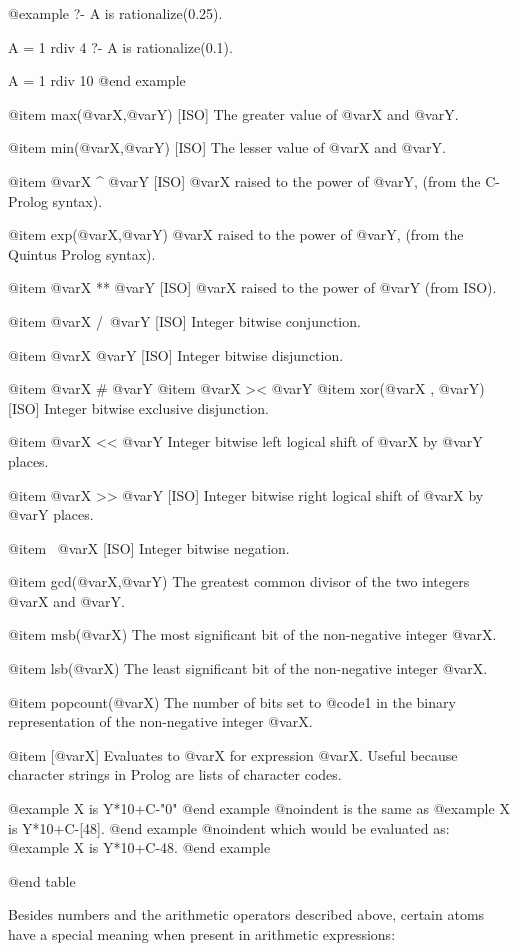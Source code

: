 {{{{@example
?- A is rationalize(0.25).

A = 1 rdiv 4
?- A is rationalize(0.1).

A = 1 rdiv 10
@end example


@item max(@var{X},@var{Y}) [ISO]
The greater value of @var{X} and @var{Y}.

@item min(@var{X},@var{Y}) [ISO]
The lesser value of @var{X} and @var{Y}.

@item @var{X} ^ @var{Y} [ISO]
@var{X} raised to the power of @var{Y}, (from the C-Prolog syntax).

@item exp(@var{X},@var{Y})
@var{X} raised to the power of @var{Y}, (from the Quintus Prolog syntax).

@item @var{X} ** @var{Y} [ISO]
@var{X} raised to the power of @var{Y}  (from ISO).

@item @var{X} /\ @var{Y} [ISO]
Integer bitwise conjunction.

@item @var{X} \/ @var{Y} [ISO]
Integer bitwise disjunction.

@item @var{X} # @var{Y}
@item @var{X} >< @var{Y}
@item xor(@var{X} , @var{Y}) [ISO]
Integer bitwise exclusive disjunction.

@item @var{X} << @var{Y}
Integer bitwise left logical shift of @var{X} by @var{Y} places.

@item @var{X} >> @var{Y} [ISO]
Integer bitwise right logical shift of @var{X} by @var{Y} places.

@item \ @var{X} [ISO]
Integer bitwise negation.

@item gcd(@var{X},@var{Y})
The greatest common divisor of the two integers @var{X} and @var{Y}.

@item msb(@var{X})
The most significant bit of the non-negative integer @var{X}.

@item lsb(@var{X})
The least significant bit of the non-negative integer @var{X}.

@item popcount(@var{X})
The number of bits set to @code{1} in the binary representation of the
non-negative integer @var{X}.

@item [@var{X}]
Evaluates to @var{X} for expression @var{X}. Useful because character
strings in Prolog are lists of character codes.

@example
X is Y*10+C-"0"
@end example
@noindent
is the same as
@example
X is Y*10+C-[48].
@end example
@noindent
which would be evaluated as:
@example
X is Y*10+C-48.
@end example

@end table

Besides numbers and the arithmetic operators described above, certain
atoms have a special meaning when present in arithmetic expressions:

}}}}
